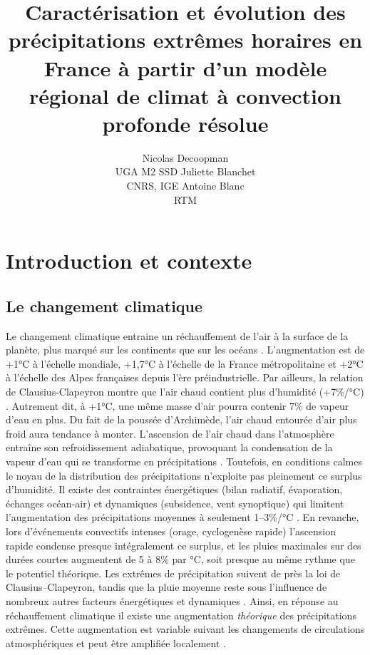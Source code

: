 \documentclass[
  article,
  nofooter,
  noheadings]{jss}
\author{Nicolas Decoopman\\UGA M2 SSD \And Juliette Blanchet\\CNRS,
IGE \And Antoine Blanc\\RTM}
\title{Caractérisation et évolution des précipitations extrêmes horaires
en France à partir d'un modèle régional de climat à convection profonde
résolue}
\begin{document}
\maketitle


\newpage

\section{Introduction et contexte}\label{introduction-et-contexte}

\subsection{Le changement climatique}\label{le-changement-climatique}

Le changement climatique entraine un réchauffement de l'air à la surface
de la planète, plus marqué sur les continents que sur les océans
\citep{IPCC2021}. L'augmentation est de +1°C à l'échelle mondiale,
+1,7°C à l'échelle de la France métropolitaine et +2°C à l'échelle des
Alpes françaises depuis l'ère préindustrielle. Par ailleurs, la relation
de Clausius-Clapeyron montre que l'air chaud contient plus d'humidité
(+7\%/°C) \citep{clapeyron1834}. Autrement dit, à +1°C, une même masse
d'air pourra contenir 7\% de vapeur d'eau en plus. Du fait de la poussée
d'Archimède, l'air chaud entourée d'air plus froid aura tendance à
monter. L'ascension de l'air chaud dans l'atmosphère entraîne son
refroidissement adiabatique, provoquant la condensation de la vapeur
d'eau qui se transforme en précipitations \citep{meteofrance}.
Toutefois, en conditions calmes le noyau de la distribution des
précipitations n'exploite pas pleinement ce surplus d'humidité. Il
existe des contraintes énergétiques (bilan radiatif, évaporation,
échanges océan‑air) et dynamiques (subsidence, vent synoptique) qui
limitent l'augmentation des précipitations moyennes à seulement
1--3\%/°C \citep{IPCC2021}. En revanche, lors d'événements convectifs
intenses (orage, cyclogenèse rapide) l'ascension rapide condense presque
intégralement ce surplus, et les pluies maximales sur des durées courtes
augmentent de 5 à 8\% par °C, soit presque au même rythme que le
potentiel théorique. Les extrêmes de précipitation suivent de près la
loi de Clausius--Clapeyron, tandis que la pluie moyenne reste sous
l'influence de nombreux autres facteurs énergétiques et dynamiques
\citep{ogorman2015contrasting}. Ainsi, en réponse au réchauffement
climatique il existe une augmentation \emph{théorique} des
précipitations extrêmes. Cette augmentation est variable suivant les
changements de circulations atmosphériques et peut être amplifiée
localement \citep{blanchet2021explaining}.
\end{document}

